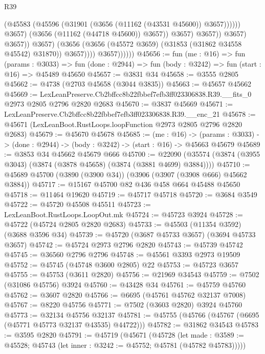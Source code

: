 \begin{lexlean}{R39}
\begin{coremodule}
                                            (@45583
                                              (@45596
                                                (@31901 (@3656 (@11162 (@43531 @45600)) @3657))))))
                                        @3657)
                                      (@3656 (@11162 (@44718 @45600)) @3657))
                                    @3657)
                                  @3657))
                              @3657)
                            @3657))
                        @3657)
                      (@3656 (@3656 (@45572 @3659) (@31853 (@31862 @34558 @45542) @31870)) @3657))))
                @3657))))))
@45656 := fun (me : @16) =>
  fun (params : @3033) =>
  fun (done : @2944) => fun (body : @3242) => fun (start : @16) => @45489 @45650
@45657 := @3831 @34
@45658 := @3555 @2805
@45662 := @4738 (@2703 @45658 (@3044 @3835))
@45663 := @45657 @45662
@45669 := LexLeanPreserve.Cb2bffcc8b22fbbef7efb3ff023306838.R39.__fits_0
    @2973
    @2805
    @2796
    @2820
    @2683
@45670 := @3837 @45669
@45671 := LexLeanPreserve.Cb2bffcc8b22fbbef7efb3ff023306838.R39.__enc_21
@45678 := @45671 (LexLeanBoot.RustLoops.loopFunction @2973 @2805 @2796 @2820 @2683)
@45679 := @45670 @45678
@45685 := (me : @16) ->
  (params : @3033) -> (done : @2944) -> (body : @3242) -> (start : @16) -> @45663 @45679
@45689 := @3853 @34 @45662 @45679 @666
@45700 := @22090 (@35574 (@3874 (@3955 @3043) (@3874 (@3878 @45658) (@3874 (@3881 @4699) @3884))))
@45710 := @45689 @45700 (@3890 (@3900 @34)) (@3906 (@3907 (@3908 @666) @45662 @3884))
@45717 := @15167 @45700 @82 @436 @458 @664 @45488 @45650
@45718 := @11464 @19620
@45719 := @45717 @45718
@45720 := @3684 @3549
@45722 := @45720 @45508 @45511
@45723 := LexLeanBoot.RustLoops.LoopOut.mk
@45724 := @45723 @3924
@45728 := @45722 (@45724 @2805 @2820 @2683)
@45733 := @45503 (@11354 @3592) (@3688 @3596 @34)
@45739 := @45720 (@3687 @45733 @3657) (@3694 @45733 @3657)
@45742 := @45724 @2973 @2796 @2820
@45743 := @45739 @45742
@45745 := @36560 @2796 @2796
@45748 := @45561 @3393 @2973 @19509
@45752 := @45745 (@45748 @3600 @2805) @22
@45753 := @45723 @3657
@45755 := @45753 (@3611 @2820)
@45756 := @21969 @34543
@45759 := @7502 (@31086 @45756) @3924
@45760 := @43428 @34
@45761 := @45759 @45760
@45762 := @3607 @2820
@45766 := @6695 (@45761 @45762 @32137 @7008)
@45767 := @8220 @45756
@45771 := @7502 (@3603 @2820) @3924 @45760
@45773 := @32134 @45756 @32137
@45781 := @45755 (@45766 (@45767 (@6695 (@45771 @45773 @32137 @43535) @44722)))
@45782 := @31862 @34543
@45783 := @3595 @2820
@45791 := @45719
    (@45671
      (@45728
        (let made : @3589 := @45528; @45743 (let inner : @3242 := @45752; @45781 (@45782 @45783)))))

\end{coremodule}
\end{lexlean}
